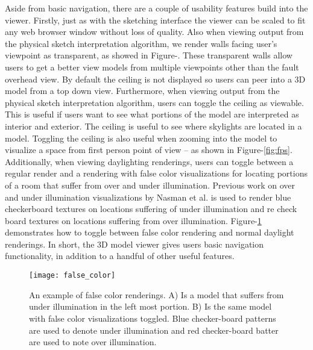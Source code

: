 	Aside from basic navigation, there are a couple of usability features build into the viewer.
	Firstly, just as with the sketching interface the viewer can be scaled to fit any web browser window without loss of quality. 
	Also when viewing output from the physical sketch interpretation algorithm, we render walls facing user's viewpoint as transparent, as showed in Figure-\cite{}. 
	These transparent walls  allow users to get a better view models from multiple viewpoints other than the fault overhead view.
	By default the ceiling is not displayed so users can peer into a 3D model from a top down view.
	Furthermore, when viewing output from the physical sketch interpretation algorithm, users can toggle the ceiling as viewable. 
	This is useful if users want to see what portions of the model are interpreted as interior and exterior. 
	The ceiling is useful to see where skylights are located in a model.
	Toggling the ceiling is also useful when zooming into the model to visualize a space from first person point of view -- as shown in Figure-\ref{fig:fps}.
	Additionally, when viewing daylighting renderings, users can toggle between a regular render and a rendering with false color visualizations for locating portions of a room that suffer from over and under illumination.
	Previous work on over and under illumination visualizations by Nasman et al. is used to render blue checkerboard textures on locations suffering of under illumination and re check board textures on locations suffering from over illumination\cite{nasman2013physical}.
	Figure-\ref{fig:false_color} demonstrates how to toggle between false color rendering and normal daylight renderings.
	In short, the 3D model viewer gives users basic navigation functionality, in addition to a handful of other useful features.

	\begin{figure}[t]
	\centering
	\texttt{[image: false\_color]}
	\caption{An example of false color renderings. A) Is a model that suffers from under illumination in the left most portion. B) Is the same model with false color visualizations toggled. Blue checker-board patterns are used to denote under illumination and red checker-board batter are used to note over illumination.}
	\label{fig:false_color}
	\end{figure}



